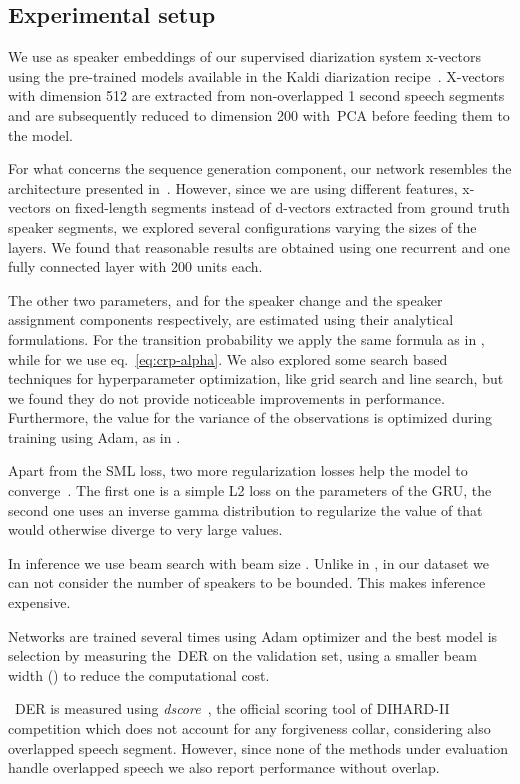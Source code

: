 \documentclass{article}
\begin{document}
\subsection{Experimental setup}
\label{sec:setup}
We use as speaker embeddings of our supervised diarization system x-vectors~\cite{Sell2018} using the pre-trained models available in the Kaldi diarization recipe~\cite{Povey_ASRU2011}. X-vectors with dimension 512 are extracted from non-overlapped 1 second speech segments and are subsequently reduced to dimension 200 with~\ac{PCA} before feeding them to the model.

For what concerns the sequence generation component, our network resembles the architecture presented in~\cite{zhang2019fully}. However, since we are using different features, x-vectors on fixed-length segments instead of d-vectors extracted from ground truth speaker segments, we explored several configurations varying the sizes of the layers. We found that reasonable results are obtained using one recurrent and one fully connected layer with 200 units each.

The other two parameters,  and  for the speaker change and the speaker assignment components respectively, are estimated using their analytical formulations. For the transition probability  we apply the same formula as in \cite{zhang2019fully}, while for  we use eq.~\ref{eq:crp-alpha}. We also explored some search based techniques for hyperparameter optimization, like grid search and line search, but we found they do not provide noticeable improvements in performance. Furthermore, the value for the variance of the observations  is optimized during training using Adam, as in \cite{zhang2019fully}. 

Apart from the SML loss, two more regularization losses help the model to converge~\cite{uisrnn-official-library}. The first one is a simple L2 loss on the parameters of the GRU, the second one uses an inverse gamma distribution to regularize the value of  that would otherwise diverge to very large values.

In inference we use beam search with beam size . Unlike in \cite{zhang2019fully}, in our dataset we can not consider the number of speakers to be bounded. This makes inference expensive.

Networks are trained several times using Adam optimizer and the best model is selection by measuring the~\ac{DER} on the validation set, using a smaller beam width () to reduce the computational cost. 

~\ac{DER} is measured using \textit{dscore}~\cite{dscore}, the official scoring tool of DIHARD-II competition which does not account for any forgiveness collar, considering also overlapped speech segment. However, since none of the methods under evaluation handle overlapped speech we also report performance without overlap. 
\end{document}
